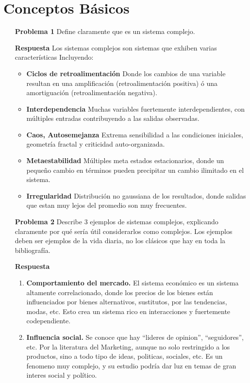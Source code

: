 \documentclass{article}
\theoremstyle{definition}
\theoremstyle{remark}
\begin{document}
\section{Conceptos Básicos}
\begin{enumerate}
  
\item[\bf{Problema 1}] Define claramente que es un sistema complejo.\\
\item[\bf{Respuesta}] Los sistemas complejos son sistemas que exhiben varias características  Incluyendo: \\
\begin{itemize}
\item{\bf Ciclos de retroalimentación} Donde los cambios de una variable resultan en una amplificación (retroalimentación positiva) ó una amortiguación (retroalimentación negativa).
\item{\bf Interdependencia}  Muchas variables fuertemente interdependientes, con múltiples entradas contribuyendo a las salidas observadas. 
\item{\bf Caos, Autosemejanza} Extrema sensibilidad a las condiciones iniciales, geometría fractal y criticidad auto-organizada. 
\item{\bf Metaestabilidad} Múltiples meta estados estacionarios, donde un pequeño cambio en términos pueden precipitar un cambio ilimitado en el sistema.
\item{\bf Irregularidad}  Distribución no gaussiana de los resultados, donde salidas que estan muy lejos del promedio son muy frecuentes.
\end{itemize}

\item[\bf{Problema 2}] Describe 3 ejemplos de sistemas complejos, explicando claramente por
qué sería útil considerarlos como complejos. Los ejemplos deben ser ejemplos de la vida diaria, no los clásicos que hay en toda la bibliografía.
\item[\bf{Respuesta}]

\begin{enumerate}
\item {\bf Comportamiento del mercado.}
El sistema económico es un sistema altamente correlacionado, donde los precios de los bienes están influenciados por bienes alternativos, sustitutos, por las tendencias, modas, etc.
Esto crea un sistema rico en interacciones y fuertemente codependiente.

\item {\bf Influencia social.}
Se conoce que hay ``lideres de opinion'', ``seguidores'', etc. Por la literatura del Marketing, aunque no solo restringido a los productos, sino a todo tipo de ideas, politicas, sociales, etc. Es un fenomeno muy complejo, y su estudio podría dar luz en temas de gran interes social y político.

\end{enumerate}
\end{enumerate}


%
%
\end{document}

